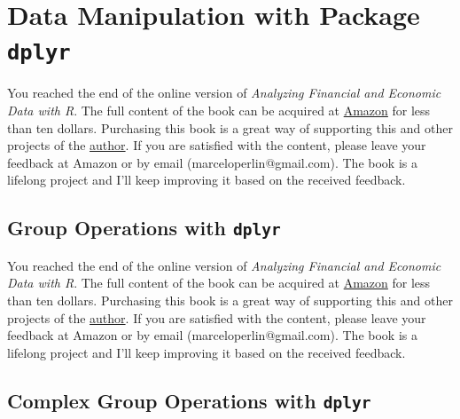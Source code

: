 \documentclass[
  12pt,
]{book}
\newenvironment{pleasebuyit}
{\begin{noteblock}
		
	} {\end{noteblock}}
\begin{document}
\hypertarget{data-manipulation-with-package-dplyr}{%
\section{\texorpdfstring{Data Manipulation with Package \texttt{dplyr}}{Data Manipulation with Package dplyr}}\label{data-manipulation-with-package-dplyr}}

\begin{pleasebuyit}
You reached the end of the online version of \emph{Analyzing Financial
and Economic Data with R}. The full content of the book can be acquired
at \href{https://www.amazon.com/dp/B084LSNXMN}{Amazon} for less than ten
dollars. Purchasing this book is a great way of supporting this and
other projects of the \href{https://www.msperlin.com/}{author}. If you
are satisfied with the content, please leave your feedback at Amazon or
by email (marceloperlin@gmail.com). The book is a lifelong project and
I'll keep improving it based on the received feedback.
\end{pleasebuyit}

\hypertarget{group-operations-with-dplyr}{%
\subsection{\texorpdfstring{Group Operations with \texttt{dplyr}}{Group Operations with dplyr}}\label{group-operations-with-dplyr}}

\begin{pleasebuyit}
You reached the end of the online version of \emph{Analyzing Financial
and Economic Data with R}. The full content of the book can be acquired
at \href{https://www.amazon.com/dp/B084LSNXMN}{Amazon} for less than ten
dollars. Purchasing this book is a great way of supporting this and
other projects of the \href{https://www.msperlin.com/}{author}. If you
are satisfied with the content, please leave your feedback at Amazon or
by email (marceloperlin@gmail.com). The book is a lifelong project and
I'll keep improving it based on the received feedback.
\end{pleasebuyit}

\hypertarget{complex-group-operations-with-dplyr}{%
\subsection{\texorpdfstring{Complex Group Operations with \texttt{dplyr}}{Complex Group Operations with dplyr}}\label{complex-group-operations-with-dplyr}}
\end{document}
